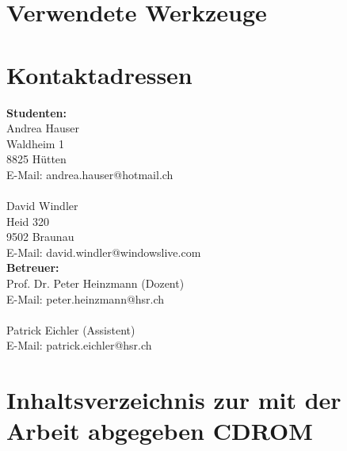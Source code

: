 \documentclass[12pt, a4paper]{report}
\begin{document}
	 

	\chapter{Verwendete Werkzeuge}
	
	
	
	\chapter{Kontaktadressen}
	\begin{multicols}{2}
	\noindent \textbf{Studenten:}
	\\
	Andrea Hauser\\
	Waldheim 1\\
	8825 Hütten\\
	E-Mail: andrea.hauser@hotmail.ch\\
	\\
	David Windler\\
	Heid 320\\
	9502 Braunau\\
	\columnbreak
	E-Mail: david.windler@windowslive.com\\
	\textbf{Betreuer:}\\
	Prof. Dr. Peter Heinzmann (Dozent)\\
	E-Mail: peter.heinzmann@hsr.ch\\
	\\
	Patrick Eichler (Assistent)\\
	E-Mail: patrick.eichler@hsr.ch\\
	
	\end{multicols}
	
	
	\chapter{Inhaltsverzeichnis zur mit der Arbeit abgegeben CDROM}
	
	
	
	
	
	
	
	
	
	
\end{document}
